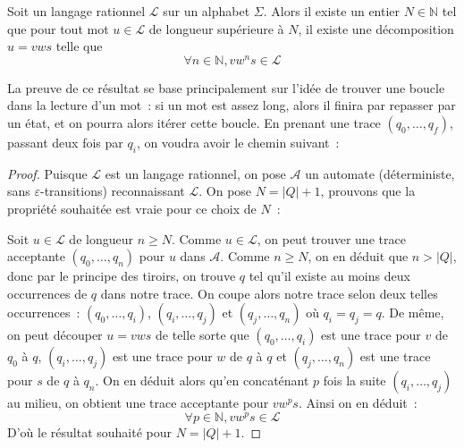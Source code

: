 \begin{lemma}[de l'étoile]
  Soit un langage rationnel $\mathcal L$ sur un alphabet $\Sigma$. Alors il
  existe un entier $N \in \mathbb N$ tel que pour tout mot $u\in\mathcal L$ de
  longueur supérieure à $N$, il existe une décomposition $u = vws$ telle que
  \[\forall n \in \mathbb N, vw^ns \in \mathcal L\]
\end{lemma}

La preuve de ce résultat se base principalement sur l'idée de trouver une boucle
dans la lecture d'un mot~: si un mot est assez long, alors il finira par
repasser par un état, et on pourra alors itérer cette boucle. En prenant
une trace $(q_0,\ldots,q_f)$, passant deux fois par $q_i$, on voudra avoir
le chemin suivant~:

\begin{figure}[H]
  \centering
\end{figure}

\begin{proof}
  Puisque $\mathcal L$ est un langage rationnel, on pose $\mathcal A$ un
  automate (déterministe, sans $\varepsilon$-transitions) reconnaissant
  $\mathcal L$. On pose $N = |Q| + 1$, prouvons que la propriété souhaitée est
  vraie pour ce choix de $N$~:

  Soit $u\in\mathcal L$ de longueur $n \geq N$. Comme $u \in \mathcal L$, on
  peut trouver une trace acceptante $(q_0,\ldots,q_n)$ pour $u$ dans
  $\mathcal A$. Comme $n \geq N$, on en déduit que $n > |Q|$, donc par le
  principe des tiroirs, on trouve $q$ tel qu'il existe au moins deux occurrences
  de $q$ dans notre trace. On coupe alors notre trace selon deux telles
  occurrences~: $(q_0,\ldots,q_i)$, $(q_i,\ldots,q_j)$ et $(q_j,\ldots,q_n)$
  où $q_i = q_j = q$. De même, on peut découper $u = vws$ de telle sorte que
  $(q_0,\ldots,q_i)$ est une trace pour $v$ de $q_0$ à $q$,
  $(q_i,\ldots,q_j)$ est une trace pour $w$ de $q$ à $q$
  et $(q_j,\ldots,q_n)$ est une trace pour $s$ de $q$ à $q_n$. On en déduit
  alors qu'en concaténant $p$ fois la suite $(q_i,\ldots,q_j)$ au milieu, on
  obtient une trace acceptante pour $vw^ps$. Ainsi on en déduit~:
  \[\forall p \in \mathbb N, vw^ps\in \mathcal L\]
  D'où le résultat souhaité pour $N = |Q| + 1$.
\end{proof}

